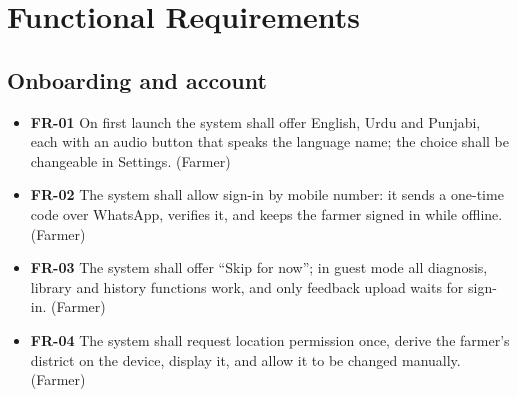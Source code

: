 \section{Functional Requirements}
\label{sec:fr}
\subsection{Onboarding and account}
\begin{itemize}
  \item \textbf{FR-01} On first launch the system shall offer English, Urdu and Punjabi, each with an audio button that speaks the language name; the choice shall be changeable in Settings. (Farmer)
  \item \textbf{FR-02} The system shall allow sign-in by mobile number: it sends a one-time code over WhatsApp, verifies it, and keeps the farmer signed in while offline. (Farmer)
  \item \textbf{FR-03} The system shall offer ``Skip for now''; in guest mode all diagnosis, library and history functions work, and only feedback upload waits for sign-in. (Farmer)
  \item \textbf{FR-04} The system shall request location permission once, derive the farmer's district on the device, display it, and allow it to be changed manually. (Farmer)
\end{itemize}
